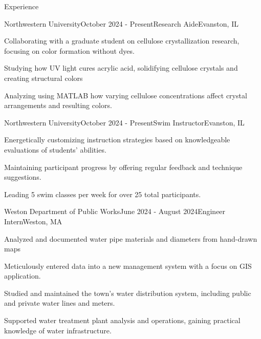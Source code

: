 \documentclass[
	a4paper, %
	9pt, %
]{resume} %
\begin{document}
\begin{rSection}{Experience}

	\begin{rSubsection}{Northwestern University}{October 2024 - Present}{Research Aide}{Evanston, IL}
		\item Collaborating with a graduate student on cellulose crystallization research, focusing on color formation without dyes.
		\item Studying how UV light cures acrylic acid, solidifying cellulose crystals and creating structural colors
		\item Analyzing using MATLAB how varying cellulose concentrations affect crystal arrangements and resulting colors.
	\end{rSubsection}


	\begin{rSubsection}{Northwestern University}{October 2024 - Present}{Swim Instructor}{Evanston, IL}
		\item Energetically customizing instruction strategies based on knowledgeable evaluations of students' abilities.
		\item Maintaining participant progress by offering regular feedback and technique suggestions.
		\item Leading 5 swim classes per week for over 25 total participants.
	\end{rSubsection}


	\begin{rSubsection}{Weston Department of Public Works}{June 2024 - August 2024}{Engineer Intern}{Weston, MA}
		\item Analyzed and documented water pipe materials and diameters from hand-drawn maps
		\item Meticulously entered data into a new management system with a focus on GIS application.
		\item Studied and maintained the town’s water distribution system, including public and private water lines and meters.
		\item Supported water treatment plant analysis and operations, gaining practical knowledge of water infrastructure.
	\end{rSubsection}

\end{rSection}

\end{document}
